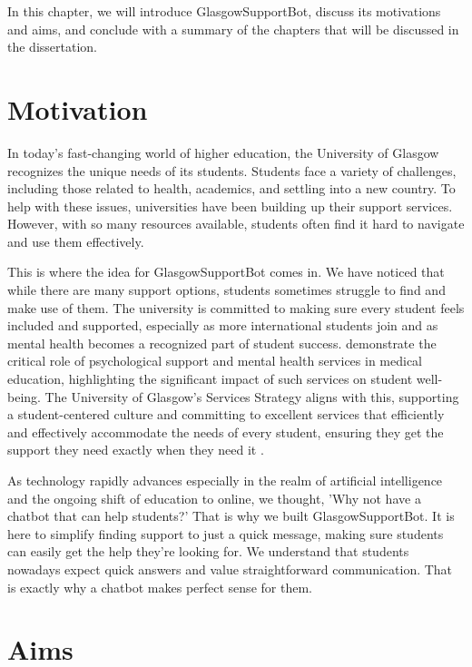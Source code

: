 \documentclass{l4proj}
\begin{document}
In this chapter, we will introduce GlasgowSupportBot, discuss its motivations and aims, and conclude with a summary of the chapters that will be discussed in the dissertation.


\section{Motivation}

In today's fast-changing world of higher education, the University of Glasgow recognizes the unique needs of its students. Students face a variety of challenges, including those related to health, academics, and settling into a new country. To help with these issues, universities have been building up their support services. However, with so many resources available, students often find it hard to navigate and use them effectively.

This is where the idea for GlasgowSupportBot comes in. We have noticed that while there are many support options, students sometimes struggle to find and make use of them. The university is committed to making sure every student feels included and supported, especially as more international students join and as mental health becomes a recognized part of student success. \cite{gacs2023role} demonstrate the critical role of psychological support and mental health services in medical education, highlighting the significant impact of such services on student well-being. The University of Glasgow's Services Strategy aligns with this, supporting a student-centered culture and committing to excellent services that efficiently and effectively accommodate the needs of every student, ensuring they get the support they need exactly when they need it \citep{services}.

As technology rapidly advances especially in the realm of artificial intelligence and the ongoing shift of education to online, we thought, 'Why not have a chatbot that can help students?' That is why we built GlasgowSupportBot. It is here to simplify finding support to just a quick message, making sure students can easily get the help they're looking for. We understand that students nowadays expect quick answers and value straightforward communication. That is exactly why a chatbot makes perfect sense for them.

\section{Aims}
\end{document}
